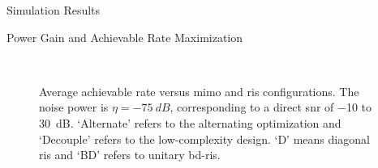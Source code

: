 \documentclass[journal]{IEEEtran}
\begin{document}
\begin{section}{Simulation Results}
\begin{subsection}{Power Gain and Achievable Rate Maximization}
		\begin{figure}[!t]
			\centering
			\\
			\caption{
				Average achievable rate versus \gls{mimo} and \gls{ris} configurations.
				The noise power is $\eta = \qty{-75}{dB}$, corresponding to a direct \gls{snr} of \num{-10} to \qty{30}{dB}.
				`Alternate' refers to the alternating optimization and `Decouple' refers to the low-complexity design.
				`D' means diagonal \gls{ris} and `BD' refers to unitary \gls{bd}-\gls{ris}.
			}
			\label{fg:rate}
		\end{figure}


\end{subsection}
\end{section}
\end{document}
